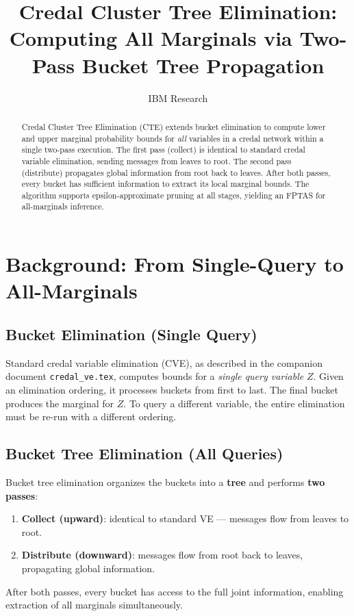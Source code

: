 \documentclass[11pt]{article}
\title{Credal Cluster Tree Elimination:\\Computing All Marginals via Two-Pass Bucket Tree Propagation}
\author{IBM Research}
\date{}
\begin{document}
\maketitle

\begin{abstract}
Credal Cluster Tree Elimination (CTE) extends bucket elimination to compute
lower and upper marginal probability bounds for \emph{all} variables in a credal
network within a single two-pass execution. The first pass (collect) is identical
to standard credal variable elimination, sending messages from leaves to root.
The second pass (distribute) propagates global information from root back to leaves.
After both passes, every bucket has sufficient information to extract its local
marginal bounds. The algorithm supports epsilon-approximate pruning at all stages,
yielding an FPTAS for all-marginals inference.
\end{abstract}

\section{Background: From Single-Query to All-Marginals}

\subsection{Bucket Elimination (Single Query)}

Standard credal variable elimination (CVE), as described in the companion document
\texttt{credal\_ve.tex}, computes bounds for a \emph{single query variable} $Z$. Given
an elimination ordering, it processes buckets from first to last. The final bucket
produces the marginal for $Z$. To query a different variable, the entire elimination
must be re-run with a different ordering.

\subsection{Bucket Tree Elimination (All Queries)}

Bucket tree elimination organizes the buckets into a \textbf{tree} and performs
\textbf{two passes}:
\begin{enumerate}
  \item \textbf{Collect (upward)}: identical to standard VE --- messages flow from
        leaves to root.
  \item \textbf{Distribute (downward)}: messages flow from root back to leaves,
        propagating global information.
\end{enumerate}
After both passes, every bucket has access to the full joint information, enabling
extraction of all marginals simultaneously.
\end{document}
